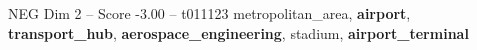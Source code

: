 \begin{textsample}{NEG Dim 2 – Score -3.00 – t011123}  \label{ex:f2_neg_024}
metropolitan\_area, \textbf{airport}, \textbf{transport\_hub}, \textbf{aerospace\_engineering}, stadium, \textbf{airport\_terminal}

\end{textsample}
